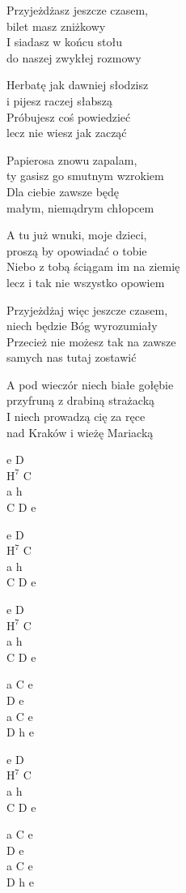 \begin{text}
    Przyjeżdżasz jeszcze czasem,\\
    bilet masz zniżkowy\\
    I siadasz w końcu stołu\\
    do naszej zwykłej rozmowy

    Herbatę jak dawniej słodzisz\\
    i pijesz raczej słabszą\\
    Próbujesz coś powiedzieć\\
    lecz nie wiesz jak zacząć

    Papierosa znowu zapalam,\\
    ty gasisz go smutnym wzrokiem\\
    Dla ciebie zawsze będę\\
    małym, niemądrym chłopcem

    \vin A tu już wnuki, moje dzieci,\\
    \vin proszą by opowiadać o tobie\\
    \vin Niebo z tobą ściągam im na ziemię\\
    \vin lecz i tak nie wszystko opowiem

    Przyjeżdżaj więc jeszcze czasem,\\
    niech będzie Bóg wyrozumiały\\
    Przecież nie możesz tak na zawsze\\
    samych nas tutaj zostawić

    \vin A pod wieczór niech białe gołębie\\
    \vin przyfruną z drabiną strażacką\\
    \vin I niech prowadzą cię za ręce\\
    \vin nad Kraków i wieżę Mariacką
\end{text}
\begin{chord}
    e D\\
    $\mathrm{H^{7}}$ C\\
    a h\\
    C D e

    e D\\
    $\mathrm{H^{7}}$ C\\
    a h\\
    C D e

    e D\\
    $\mathrm{H^{7}}$ C\\
    a h\\
    C D e

    a C e\\
    D e\\
    a C e\\
    D h e

    e D\\
    $\mathrm{H^{7}}$ C\\
    a h\\
    C D e

    a C e\\
    D e\\
    a C e\\
    D h e
\end{chord}
